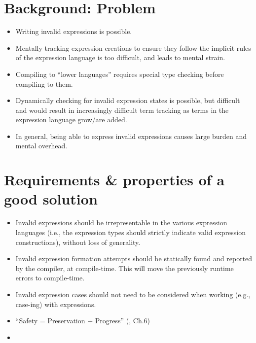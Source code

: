 \section{Background: Problem}

\begin{itemize}
    
    \item Writing invalid expressions is possible.
    
    \item Mentally tracking expression creations to ensure they follow the
          implicit rules of the expression language is too difficult, and leads
          to mental strain.

    \item Compiling to ``lower languages'' requires special type checking before
          compiling to them. 
    
    \item Dynamically checking for invalid expression states is possible, but
          difficult and would result in increasingly difficult term tracking as
          terms in the expression language grow/are added.

    \item In general, being able to express invalid expressions causes large
          burden and mental overhead.
    
\end{itemize}


\section{Requirements \& properties of a good solution}

\begin{itemize}
    
    \item Invalid expressions should be irrepresentable in the various expression
          languages (i.e., the expression types should strictly indicate valid
          expression constructions), without loss of generality.
    
    \item Invalid expression formation attempts should be statically found and
          reported by the compiler, at compile-time. This will move the
          previously runtime errors to compile-time.

    \item Invalid expression cases should not need to be considered when working
          (e.g., case-ing) with expressions.

    \item ``Safety = Preservation + Progress'' (\cite{harper2016pfpl}, Ch.6)
    
    \item {}

\end{itemize}

